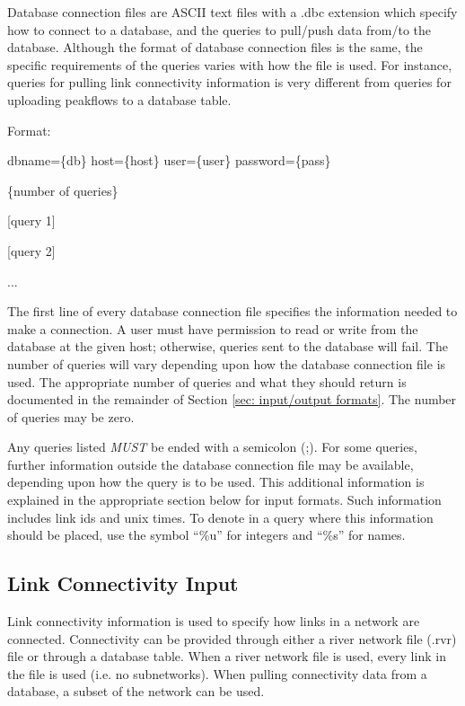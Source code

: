 \documentclass[12pt]{article}
\newenvironment{codeindent}
{\begin{list}{}
        {\setlength{\leftmargin}{.1in}}
        \item[]
}
{\end{list}}
\begin{document}
Database connection files are ASCII text files with a .dbc extension which specify how to connect to a database, and the queries to pull/push data from/to the database. Although the format of database connection files is the same, the specific requirements of the queries varies with how the file is used. For instance, queries for pulling link connectivity information is very different from queries for uploading peakflows to a database table.
\begin{codeindent}
 Format:
 
 dbname=\{db\} host=\{host\} user=\{user\} password=\{pass\}
 
 \{number of queries\}
 
 [query 1]
 
 [query 2]
 
 ...
\end{codeindent}
The first line of every database connection file specifies the information needed to make a connection. A user must have permission to read or write from the database at the given host; otherwise, queries sent to the database will fail. The number of queries will vary depending upon how the database connection file is used. The appropriate number of queries and what they should return is documented in the remainder of Section \ref{sec: input/output formats}. The number of queries may be zero.

Any queries listed \emph{MUST} be ended with a semicolon (;). For some queries, further information outside the database connection file may be available, depending upon how the query is to be used. This additional information is explained in the appropriate section below for input formats. Such information includes link ids and unix times. To denote in a query where this information should be placed, use the symbol ``\%u'' for integers and ``\%s'' for names.


\subsection{Link Connectivity Input} \label{sec: link connectivity input}

Link connectivity information is used to specify how links in a network are connected. Connectivity can be provided through either a river network file (.rvr) file or through a database table. When a river network file is used, every link in the file is used (i.e. no subnetworks). When pulling connectivity data from a database, a subset of the network can be used.
\end{document}
